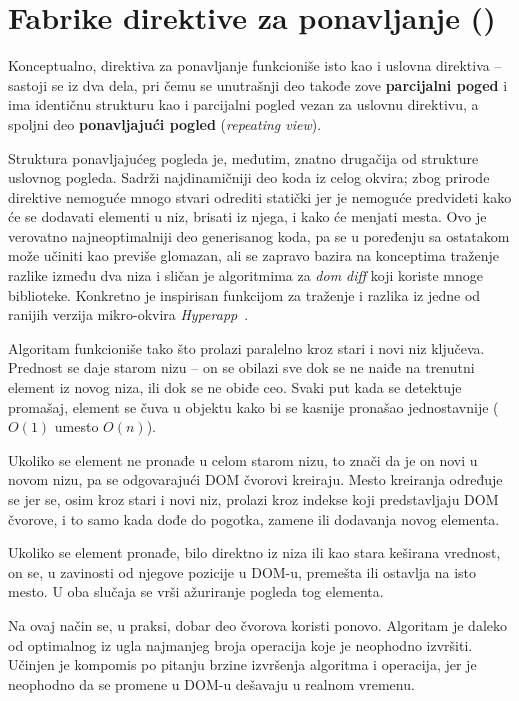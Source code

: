 \section{Fabrike direktive za ponavljanje ()}
\label{sec:fabrike-direktive-za-ponavljanje}

Konceptualno, direktiva za ponavljanje funkcioniše isto kao i uslovna direktiva -- sastoji se iz dva dela, pri čemu se unutrašnji deo takođe zove \textbf{parcijalni poged} i ima identičnu strukturu kao i parcijalni pogled vezan za uslovnu direktivu, a spoljni deo \textbf{ponavljajući pogled} (\textsl{repeating view}).

Struktura ponavljajućeg pogleda je, međutim, znatno drugačija od strukture uslovnog pogleda.
Sadrži najdinamičniji deo koda iz celog okvira; zbog prirode direktive nemoguće mnogo stvari odrediti statički jer je nemoguće predvideti kako će se dodavati elementi u niz, brisati iz njega, i kako će menjati mesta.
Ovo je verovatno najneoptimalniji deo generisanog koda, pa se u poređenju sa ostatakom može učiniti kao previše glomazan, ali se zapravo bazira na konceptima traženje razlike između dva niza i sličan je algoritmima za \textit{dom diff} koji koriste mnoge biblioteke.
Konkretno je inspirisan funkcijom za traženje i  razlika iz jedne od ranijih verzija mikro-okvira \textit{Hyperapp}~\cite{hyperapp:patch}.

Algoritam funkcioniše tako što prolazi paralelno kroz stari i novi niz ključeva.
Prednost se daje starom nizu -- on se obilazi sve dok se ne naiđe na trenutni element iz novog niza, ili dok se ne obiđe ceo.
Svaki put kada se detektuje promašaj, element se čuva u objektu kako bi se kasnije pronašao jednostavnije ($O(1)$ umesto $O(n)$).

Ukoliko se element ne pronađe u celom starom nizu, to znači da je on novi u novom nizu, pa se odgovarajući DOM čvorovi kreiraju.
Mesto kreiranja određuje se jer se, osim kroz stari i novi niz, prolazi kroz indekse koji predstavljaju DOM čvorove, i to samo kada dođe do pogotka, zamene ili dodavanja novog elementa.

Ukoliko se element pronađe, bilo direktno iz niza ili kao stara keširana vrednost, on se, u zavinosti od njegove pozicije u DOM-u, premešta ili ostavlja na isto mesto.
U oba slučaja se vrši ažuriranje pogleda tog elementa.

Na ovaj način se, u praksi, dobar deo čvorova koristi ponovo.
Algoritam je daleko od optimalnog iz ugla najmanjeg broja operacija koje je neophodno izvršiti.
Učinjen je kompomis po pitanju brzine izvršenja algoritma i operacija, jer je neophodno da se promene u DOM-u dešavaju u realnom vremenu.

